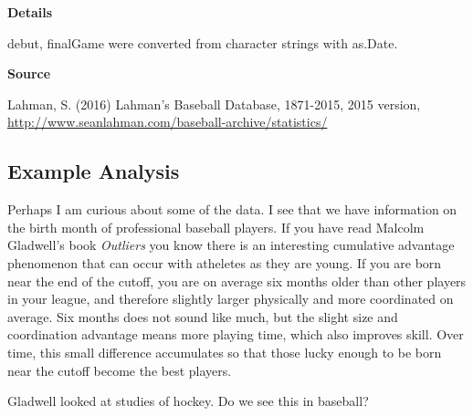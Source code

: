 \documentclass[]{book}
\newenvironment{Shaded}{\begin{snugshade}}{\end{snugshade}}
\newcommand{\CommentTok}[1]{\textcolor[rgb]{0.56,0.35,0.01}{\textit{#1}}}
\newcommand{\DataTypeTok}[1]{\textcolor[rgb]{0.13,0.29,0.53}{#1}}
\newcommand{\DecValTok}[1]{\textcolor[rgb]{0.00,0.00,0.81}{#1}}
\newcommand{\KeywordTok}[1]{\textcolor[rgb]{0.13,0.29,0.53}{\textbf{#1}}}
\newcommand{\NormalTok}[1]{#1}
\newcommand{\OperatorTok}[1]{\textcolor[rgb]{0.81,0.36,0.00}{\textbf{#1}}}
\newcommand{\StringTok}[1]{\textcolor[rgb]{0.31,0.60,0.02}{#1}}
\theoremstyle{definition}
\theoremstyle{definition}
\theoremstyle{definition}
\theoremstyle{remark}
\begin{document}
\textbf{Details}

debut, finalGame were converted from character strings with as.Date.

\textbf{Source}

Lahman, S. (2016) Lahman's Baseball Database, 1871-2015, 2015 version,
\url{http://www.seanlahman.com/baseball-archive/statistics/}

\hypertarget{example-analysis}{%
\subsection{Example Analysis}\label{example-analysis}}

Perhaps I am curious about some of the data. I see that we have
information on the birth month of professional baseball players. If you
have read Malcolm Gladwell's book \emph{Outliers} you know there is an
interesting cumulative advantage phenomenon that can occur with
atheletes as they are young. If you are born near the end of the cutoff,
you are on average six months older than other players in your league,
and therefore slightly larger physically and more coordinated on
average. Six months does not sound like much, but the slight size and
coordination advantage means more playing time, which also improves
skill. Over time, this small difference accumulates so that those lucky
enough to be born near the cutoff become the best players.

Gladwell looked at studies of hockey. Do we see this in baseball?

\begin{Shaded}
\end{Shaded}
\end{document}
